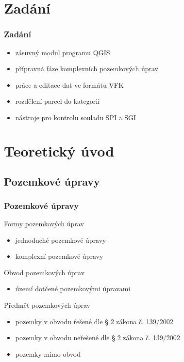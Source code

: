 \documentclass{beamer}
\begin{document}

\section{Zadání}

\begin{frame}

\frametitle{Zadání}

\begin{itemize}
	\item zásuvný modul programu QGIS
	\item přípravná fáze komplexních pozemkových úprav
	\item práce a editace dat ve formátu VFK
	\item rozdělení parcel do kategorií
	\item nástroje pro kontrolu souladu SPI a SGI
\end{itemize}

\end{frame}


\section{Teoretický úvod}

\subsection{Pozemkové úpravy} %

\begin{frame}

\frametitle{Pozemkové úpravy}

Formy pozemkových úprav
\begin{itemize}
	\item jednoduché pozemkové úpravy
	\item komplexní pozemkové úpravy
\end{itemize}

\bigskip

Obvod pozemkových úprav
\begin{itemize}
	\item území dotčené pozemkovými úpravami
\end{itemize}

\bigskip

Předmět pozemkových úprav
\begin{itemize}
	\item pozemky v obvodu řešené dle § 2 zákona č. 139/2002
	\item pozemky v obvodu neřešené dle § 2 zákona č. 139/2002
	\item pozemky mimo obvod
\end{itemize}

\end{frame}
\end{document}
